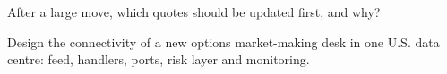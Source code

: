 \begin{interviewq}\label{iq:nw:equities-and-options-connectivity:5}
After a large move, which quotes should be updated first, and why?
\end{interviewq}

\begin{interviewq}\label{iq:nw:equities-and-options-connectivity:6}
Design the connectivity of a new options market-making desk in one U.S. data centre: feed, handlers, ports, risk layer and
monitoring.
\end{interviewq}

